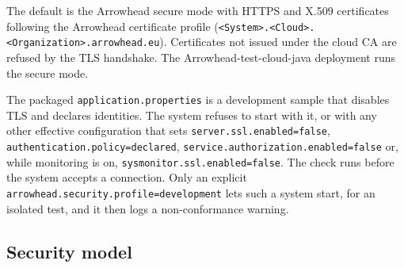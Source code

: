 \documentclass[a4paper]{arrowhead}
\begin{document}
The default is the Arrowhead secure mode with HTTPS and X.509 certificates following the Arrowhead certificate profile (\texttt{<System>.<Cloud>.<Organization>.arrowhead.eu}). Certificates not issued under the cloud CA are refused by the TLS handshake. The Arrowhead-test-cloud-java deployment runs the secure mode.

The packaged \texttt{application.properties} is a development sample that disables TLS and declares identities. The system refuses to start with it, or with any other effective configuration that sets \texttt{server.ssl.enabled=false}, \texttt{authentication.policy=declared}, \texttt{service.authorization.enabled=false} or, while monitoring is on, \texttt{sysmonitor.ssl.enabled=false}. The check runs before the system accepts a connection. Only an explicit \texttt{arrowhead.security.profile=development} lets such a system start, for an isolated test, and it then logs a non-conformance warning.

\subsection{Security model}
\end{document}
